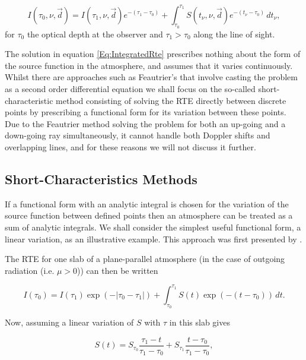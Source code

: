 \begin{equation}
I(\tau_0, \nu, \vec{d}) = I(\tau_1, \nu, \vec{d}) e^{-(\tau_1 - \tau_0)} + \int_{\tau_0}^{\tau_1}S(t_\nu, \nu, \vec{d})e^{-(t_\nu - \tau_0)}\, dt_\nu,
\label{Eq:IntegratedRte}
\end{equation}
for $\tau_0$ the optical depth at the observer and $\tau_1 > \tau_0$ along the line of sight.

The solution in equation \eqref{Eq:IntegratedRte} prescribes nothing about the form of the source function in the atmosphere, and assumes that it varies continuously.
Whilst there are approaches such as Feautrier's \citep{Feautrier1964} that involve casting the problem as a second order differential equation we shall focus on the so-called short-characteristic method consisting of solving the RTE directly between discrete points by prescribing a functional form for its variation between these points. Due to the Feautrier method solving the problem for both an up-going and a down-going ray simultaneously, it cannot handle both Doppler shifts and overlapping lines, and for these reasons we will not discuss it further.

\subsection{Short-Characteristics Methods}\label{Sec:ShortChar}

If a functional form with an analytic integral is chosen for the variation of the source function between defined points then an atmosphere can be treated as a sum of analytic integrals. We shall consider the simplest useful functional form, a linear variation, as an illustrative example.
This approach was first presented by \citet{Olson1987}.

The RTE for one slab of a plane-parallel atmosphere (in the case of outgoing radiation (i.e. $\mu > 0$)) can then be written

\begin{equation}
    I(\tau_0) = I(\tau_1) \exp(- |\tau_0 - \tau_1|) + \int_{\tau_0}^{\tau_1} S(t) \exp(-(t - \tau_0))\, dt.
    \label{Eq:ShortCharForm}
\end{equation}

Now, assuming a linear variation of $S$ with $\tau$ in this slab gives

\begin{equation}
    S(t) = S_{\tau_0} \frac{\tau_1-t}{\tau_1-\tau_0} + S_{\tau_1} \frac{t-\tau_0}{\tau_1-\tau_0},
\end{equation}

